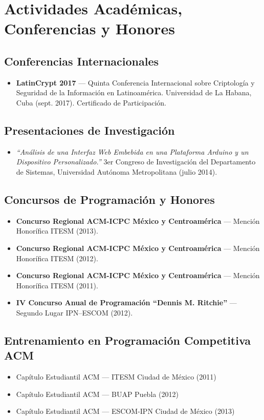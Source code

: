\section*{Actividades Académicas, Conferencias y Honores}

\subsection{Conferencias Internacionales}
\begin{itemize}[leftmargin=12pt]
    \item \textbf{LatinCrypt 2017} — Quinta Conferencia Internacional sobre Criptología y Seguridad de la Información en Latinoamérica.  
    Universidad de La Habana, Cuba (sept. 2017).  
    Certificado de Participación.
\end{itemize}

\subsection{Presentaciones de Investigación}
\begin{itemize}[leftmargin=12pt]
    \item \textit{“Análisis de una Interfaz Web Embebida en una Plataforma Arduino y un Dispositivo Personalizado.”}  
    3er Congreso de Investigación del Departamento de Sistemas, Universidad Autónoma Metropolitana (julio 2014).
\end{itemize}

\subsection{Concursos de Programación y Honores}
\begin{itemize}[leftmargin=12pt]
    \item \textbf{Concurso Regional ACM-ICPC México y Centroamérica} — Mención Honorífica  
    ITESM (2013).
    \item \textbf{Concurso Regional ACM-ICPC México y Centroamérica} — Mención Honorífica  
    ITESM (2012).
    \item \textbf{Concurso Regional ACM-ICPC México y Centroamérica} — Mención Honorífica  
    ITESM (2011).
    \item \textbf{IV Concurso Anual de Programación “Dennis M. Ritchie”} — Segundo Lugar  
    IPN–ESCOM (2012).
\end{itemize}

\subsection{Entrenamiento en Programación Competitiva ACM}
\begin{itemize}[leftmargin=12pt]
    \item Capítulo Estudiantil ACM — ITESM Ciudad de México (2011)
    \item Capítulo Estudiantil ACM — BUAP Puebla (2012)
    \item Capítulo Estudiantil ACM — ESCOM-IPN Ciudad de México (2013)
\end{itemize}
